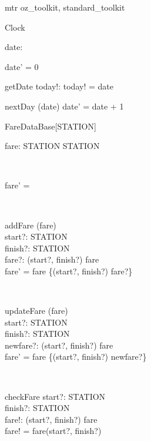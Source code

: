 \begin{zsection}
  \SECTION mtr \parents oz\_toolkit, standard\_toolkit
\end{zsection}

\zedsize{\small}
\begin{class}{Clock}
\also
\begin{state}
date:  \nat
\end{state}
\begin{init}
date' = 0\end{init}
\begin{schema}{getDate}
today!:  \nat  
\where
today! = date
\end{schema}
\begin{schema}{nextDay}
\Delta (date)
\where
date' = date + 1
\end{schema} 
\end{class} 

\begin{class}{FareDataBase}[STATION]
\also
\begin{state}
fare: STATION \cross STATION \pfun  \nat  
\end{state} \\ 
\begin{init}
fare' = \emptyset\end{init} \\ 
\begin{schema}{addFare}
\Delta (fare)\\
start?: STATION \\ 
finish?: STATION \\ 
fare?:  \nat  
\where
(start?, finish?) \notin  \dom fare \\ 
fare' = fare \cup \{(start?, finish?) \mapsto fare?\} \\ 
\end{schema} \\ 
\begin{schema}{updateFare}
\Delta (fare)\\
start?: STATION \\ 
finish?: STATION \\ 
newfare?:  \nat  
\where
 (start?, finish?) \in  \dom fare \\ 
fare' = fare \oplus \{(start?, finish?) \mapsto newfare?\} \\ 
\end{schema} \\ 
\begin{schema}{checkFare}
start?: STATION \\ 
finish?: STATION \\ 
fare!:  \nat  
\where
 (start?, finish?) \in  \dom fare \\ 
fare! = fare(start?, finish?)
\end{schema} 
\end{class} 


